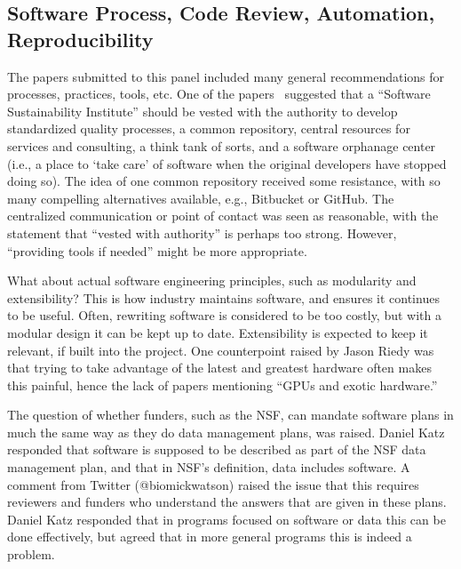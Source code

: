 \documentclass[11pt, oneside]{amsart}
\begin{document}
\subsection{Software Process, Code Review, Automation, Reproducibility}

The papers submitted to this panel included many general
recommendations for processes, practices, tools, etc. One of the
papers~\cite{Crawford_WSSSPE}
suggested that a ``Software Sustainability
Institute'' should be vested with the authority to develop
standardized quality processes, a common repository, central resources
for services and consulting, a think tank of sorts, and a software
orphanage center (i.e., a place to `take care' of software when the
original developers have stopped doing so).  The idea of one common
repository received some resistance, with so many compelling
alternatives available, e.g., Bitbucket or GitHub. The centralized
communication or point of contact was seen as reasonable, with the
statement that ``vested with authority'' is perhaps too strong. However,
``providing tools if needed'' might be more appropriate.

What about actual software engineering principles, such as modularity
and extensibility? This is how industry maintains software, and
ensures it continues to be useful. Often, rewriting software is
considered to be too costly, but with a modular design it can be kept
up to date. Extensibility is expected to keep it relevant, if built
into the project. One counterpoint raised by Jason Riedy was that
trying to take advantage of the latest and greatest hardware often
makes this painful, hence the lack of papers mentioning ``GPUs and
exotic hardware.''

The question of whether funders, such as the NSF, can mandate software
plans in much the same way as they do data management plans, was
raised. Daniel Katz responded that software is supposed to be
described as part of the NSF data management plan, and that in NSF's
definition, data includes software. A comment from Twitter
(@biomickwatson) raised the issue that this requires reviewers and
funders who understand the answers that are given in these
plans. Daniel Katz responded that in programs focused on software or
data this can be done effectively, but agreed that in more general
programs this is indeed a problem.
\end{document}
